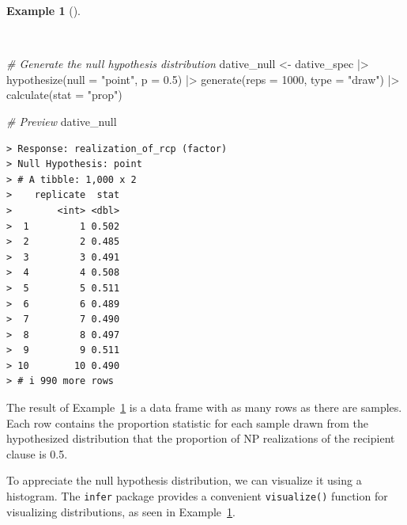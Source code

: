 \documentclass[
  letterpaper,
]{latex/krantz}
\newenvironment{Shaded}{\begin{snugshade}}{\end{snugshade}}
\newcommand{\AttributeTok}[1]{\textcolor[rgb]{0.00,0.00,0.00}{#1}}
\newcommand{\CommentTok}[1]{\textcolor[rgb]{0.00,0.00,0.00}{\textit{#1}}}
\newcommand{\DecValTok}[1]{\textcolor[rgb]{0.00,0.00,0.00}{#1}}
\newcommand{\FloatTok}[1]{\textcolor[rgb]{0.00,0.00,0.00}{#1}}
\newcommand{\FunctionTok}[1]{\textcolor[rgb]{0.00,0.00,0.00}{#1}}
\newcommand{\NormalTok}[1]{\textcolor[rgb]{0.00,0.00,0.00}{#1}}
\newcommand{\OtherTok}[1]{\textcolor[rgb]{0.00,0.00,0.00}{#1}}
\newcommand{\SpecialCharTok}[1]{\textcolor[rgb]{0.00,0.00,0.00}{#1}}
\newcommand{\StringTok}[1]{\textcolor[rgb]{0.00,0.00,0.00}{#1}}
\theoremstyle{definition}
\newtheorem{example}{Example}[chapter]
\theoremstyle{remark}
\begin{document}
\begin{example}[]\protect\hypertarget{exm-ida-cat-null-hypothesis}{}\label{exm-ida-cat-null-hypothesis}

~

\begin{Shaded}
\begin{Highlighting}[]
\CommentTok{\# Generate the null hypothesis distribution}
\NormalTok{dative\_null }\OtherTok{\textless{}{-}}
\NormalTok{  dative\_spec }\SpecialCharTok{|\textgreater{}}
  \FunctionTok{hypothesize}\NormalTok{(}\AttributeTok{null =} \StringTok{"point"}\NormalTok{, }\AttributeTok{p =} \FloatTok{0.5}\NormalTok{) }\SpecialCharTok{|\textgreater{}}
  \FunctionTok{generate}\NormalTok{(}\AttributeTok{reps =} \DecValTok{1000}\NormalTok{, }\AttributeTok{type =} \StringTok{"draw"}\NormalTok{) }\SpecialCharTok{|\textgreater{}}
  \FunctionTok{calculate}\NormalTok{(}\AttributeTok{stat =} \StringTok{"prop"}\NormalTok{)}

\CommentTok{\# Preview}
\NormalTok{dative\_null}
\end{Highlighting}
\end{Shaded}

\begin{verbatim}
> Response: realization_of_rcp (factor)
> Null Hypothesis: point
> # A tibble: 1,000 x 2
>    replicate  stat
>        <int> <dbl>
>  1         1 0.502
>  2         2 0.485
>  3         3 0.491
>  4         4 0.508
>  5         5 0.511
>  6         6 0.489
>  7         7 0.490
>  8         8 0.497
>  9         9 0.511
> 10        10 0.490
> # i 990 more rows
\end{verbatim}

\end{example}

The result of Example~\ref{exm-ida-cat-null-hypothesis} is a data frame
with as many rows as there are samples. Each row contains the proportion
statistic for each sample drawn from the hypothesized distribution that
the proportion of NP realizations of the recipient clause is 0.5.

To appreciate the null hypothesis distribution, we can visualize it
using a histogram. The \texttt{infer} package provides a convenient
\texttt{visualize()} function for visualizing distributions, as seen in
Example~\ref{exm-ida-cat-null-hypothesis}.
\end{document}
